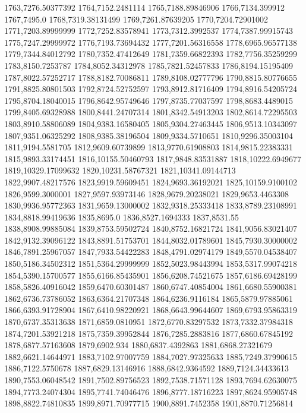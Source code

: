 1763,7276.50377392
1764,7152.2481114
1765,7188.89846906
1766,7134.399912
1767,7495.0
1768,7319.38131499
1769,7261.87639205
1770,7204.72901002
1771,7203.89999999
1772,7252.83578941
1773,7312.3992537
1774,7387.99915743
1775,7247.29999972
1776,7193.73694432
1777,7201.56316558
1778,6965.96577138
1779,7344.84012792
1780,7352.47412649
1781,7359.66822393
1782,7756.35259299
1783,8150.7253787
1784,8052.34312978
1785,7821.52457833
1786,8194.15195409
1787,8022.57252717
1788,8182.70086811
1789,8108.02777796
1790,8815.80776655
1791,8825.80801503
1792,8724.52752597
1793,8912.81716409
1794,8916.54205724
1795,8704.18040015
1796,8642.95749646
1797,8735.77037597
1798,8683.4489015
1799,8405.69328988
1800,8441.24707314
1801,8342.54913203
1802,8614.72295503
1803,8910.58806089
1804,9383.16580405
1805,9304.27463445
1806,9513.10343097
1807,9351.06325292
1808,9385.38196504
1809,9334.5710651
1810,9296.35003104
1811,9194.5581705
1812,9609.60739899
1813,9770.61908803
1814,9815.22383331
1815,9893.33174451
1816,10155.50460793
1817,9848.83531887
1818,10222.6949677
1819,10329.17099632
1820,10231.58767321
1821,10341.09144713
1822,9907.48217576
1823,9919.59609451
1824,9693.36192021
1825,10159.9100102
1826,9599.3000001
1827,9597.93973146
1828,9679.20238021
1829,9653.4463308
1830,9936.95772363
1831,9659.13000002
1832,9318.25333418
1833,8789.23108991
1834,8818.99419636
1835,8695.0
1836,8527.1694333
1837,8531.55
1838,8908.99885084
1839,8753.59502724
1840,8752.16821724
1841,9056.83021407
1842,9132.39096122
1843,8891.51753701
1844,8032.01789601
1845,7930.30000002
1846,7891.25967057
1847,7933.54422283
1848,4791.02974179
1849,5570.04538407
1850,5186.34502312
1851,5364.29999999
1852,5023.98443994
1853,5317.99074218
1854,5390.15700577
1855,6166.85435901
1856,6208.74521675
1857,6186.69428199
1858,5826.40916042
1859,6470.60301487
1860,6747.40854004
1861,6680.55900381
1862,6736.73786052
1863,6364.21707348
1864,6236.9116184
1865,5879.97885061
1866,6393.91728904
1867,6410.98220921
1868,6643.99644607
1869,6793.95863319
1870,6737.35313638
1871,6859.0810951
1872,6770.83297532
1873,7332.37984318
1874,7201.53921218
1875,7359.39952844
1876,7285.2883816
1877,6860.67845192
1878,6877.57163608
1879,6902.934
1880,6837.4392863
1881,6868.27321679
1882,6621.14644971
1883,7102.97007759
1884,7027.97325633
1885,7249.37990615
1886,7122.5750678
1887,6829.13146916
1888,6842.9364592
1889,7124.34433613
1890,7553.06048542
1891,7502.89756523
1892,7538.71571128
1893,7694.62630075
1894,7773.24074304
1895,7741.74046476
1896,8777.18716223
1897,8624.95905748
1898,8822.74810835
1899,8971.70977715
1900,8891.7452358
1901,8870.71256814
